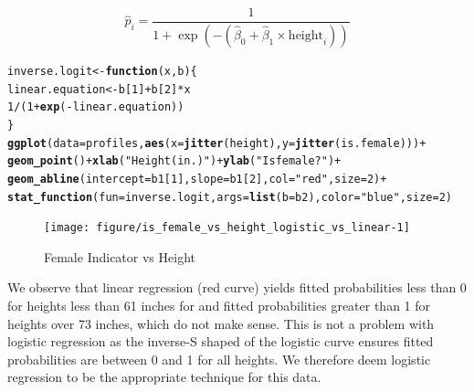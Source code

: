 \documentclass{article}\usepackage[]{graphicx}\usepackage[]{color}
\makeatletter
\newcommand{\hlnum}[1]{\textcolor[rgb]{0.686,0.059,0.569}{#1}}%
\newcommand{\hlstr}[1]{\textcolor[rgb]{0.192,0.494,0.8}{#1}}%
\newcommand{\hlopt}[1]{\textcolor[rgb]{0,0,0}{#1}}%
\newcommand{\hlstd}[1]{\textcolor[rgb]{0.345,0.345,0.345}{#1}}%
\newcommand{\hlkwa}[1]{\textcolor[rgb]{0.161,0.373,0.58}{\textbf{#1}}}%
\newcommand{\hlkwb}[1]{\textcolor[rgb]{0.69,0.353,0.396}{#1}}%
\newcommand{\hlkwc}[1]{\textcolor[rgb]{0.333,0.667,0.333}{#1}}%
\newcommand{\hlkwd}[1]{\textcolor[rgb]{0.737,0.353,0.396}{\textbf{#1}}}%
\newenvironment{kframe}{%
 \def\at@end@of@kframe{}%
 \ifinner\ifhmode%
  \def\at@end@of@kframe{\end{minipage}}%
  \begin{minipage}{\columnwidth}%
 \fi\fi%
 \def\FrameCommand##1{\hskip\@totalleftmargin \hskip-\fboxsep
 \colorbox{shadecolor}{##1}\hskip-\fboxsep
     \hskip-\linewidth \hskip-\@totalleftmargin \hskip\columnwidth}%
 \MakeFramed {\advance\hsize-\width
   \@totalleftmargin\z@ \linewidth\hsize
   \@setminipage}}%
 {\par\unskip\endMakeFramed%
 \at@end@of@kframe}
\newenvironment{knitrout}{}{} %
\makeatother
\begin{document}
\[
\widehat{p}_i = \frac{1}{1+\exp\left(-(\widehat{\beta}_0 + \widehat{\beta}_1 \times \mbox{height}_i)\right)}
\]


\begin{knitrout}
\color{fgcolor}\begin{kframe}
\begin{alltt}
\hlstd{inverse.logit} \hlkwb{<-} \hlkwa{function}\hlstd{(}\hlkwc{x}\hlstd{,} \hlkwc{b}\hlstd{)\{}
  \hlstd{linear.equation} \hlkwb{<-} \hlstd{b[}\hlnum{1}\hlstd{]} \hlopt{+} \hlstd{b[}\hlnum{2}\hlstd{]}\hlopt{*}\hlstd{x}
  \hlnum{1}\hlopt{/}\hlstd{(}\hlnum{1}\hlopt{+}\hlkwd{exp}\hlstd{(}\hlopt{-}\hlstd{linear.equation))}
\hlstd{\}}
\hlkwd{ggplot}\hlstd{(}\hlkwc{data}\hlstd{=profiles,} \hlkwd{aes}\hlstd{(}\hlkwc{x}\hlstd{=}\hlkwd{jitter}\hlstd{(height),} \hlkwc{y}\hlstd{=}\hlkwd{jitter}\hlstd{(is.female)))} \hlopt{+}
  \hlkwd{geom_point}\hlstd{()} \hlopt{+} \hlkwd{xlab}\hlstd{(}\hlstr{"Height (in.)"}\hlstd{)} \hlopt{+} \hlkwd{ylab}\hlstd{(}\hlstr{"Is female?"}\hlstd{)} \hlopt{+}
  \hlkwd{geom_abline}\hlstd{(}\hlkwc{intercept}\hlstd{=b1[}\hlnum{1}\hlstd{],} \hlkwc{slope}\hlstd{=b1[}\hlnum{2}\hlstd{],} \hlkwc{col}\hlstd{=}\hlstr{"red"}\hlstd{,} \hlkwc{size}\hlstd{=}\hlnum{2}\hlstd{)} \hlopt{+}
  \hlkwd{stat_function}\hlstd{(}\hlkwc{fun} \hlstd{= inverse.logit,} \hlkwc{args}\hlstd{=}\hlkwd{list}\hlstd{(}\hlkwc{b}\hlstd{=b2),} \hlkwc{color}\hlstd{=}\hlstr{"blue"}\hlstd{,} \hlkwc{size}\hlstd{=}\hlnum{2}\hlstd{)}
\end{alltt}
\end{kframe}\begin{figure}

{\centering \texttt{[image: figure/is\_female\_vs\_height\_logistic\_vs\_linear-1]} 

}

\caption[Female Indicator vs Height]{Female Indicator vs Height}\label{fig:is_female_vs_height_logistic_vs_linear}
\end{figure}


\end{knitrout}

We observe that linear regression (red curve) yields fitted probabilities less than 0 for heights less than 61 inches for and fitted probabilities greater than 1 for heights over 73 inches, which do not make sense.  This is not a problem with logistic regression as the inverse-S shaped of the logistic curve ensures fitted probabilities are between 0 and 1 for all heights.   We therefore deem logistic regression to be the appropriate technique for this data.
\end{document}
